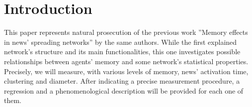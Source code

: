 \section{Introduction}
This paper represents natural prosecution of the previous work ''Memory effects in news' spreading networks'' by the same authors.
While the first explained network's structure and its main functionalities, this one investigates possible relationships between agents' memory and some network's statistical properties.
Precisely, we will measure, with various levels of memory, news' activation time, clustering and diameter.
After indicating a precise measurement procedure, a regression and a phenomenological description will be provided for each one of them.